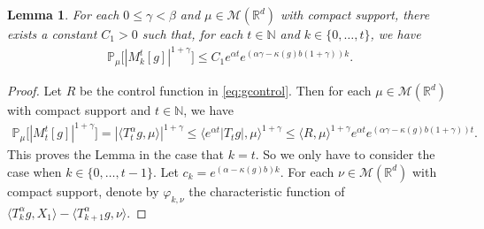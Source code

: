 \documentclass[12pt, a4paper]{amsart}
\newtheorem{lem}[thm]{Lemma}
\theoremstyle{definition}
\numberwithin{equation}{section}
\begin{document}
\begin{lem}\label{lem: lemma23}
For each $0\leq \gamma < \beta$ and $\mu \in \mathcal M(\mathbb R^d)$ with compact support, there exists a constant $C_1>0$ such that, for each $t\in \mathbb N$ and $k \in \{0,\dots,t\}$, we have
\begin{align}
\label{eq: upper bound of 1+gamma moment of Mktg}
    \mathbb P_\mu\big[|M_k^t[g]|^{1+\gamma}\big]
    \leq C_1 e^{\alpha t}e^{(\alpha \gamma - \kappa(g)b(1+\gamma))k}.
\end{align}
\end{lem}
\begin{proof}
    Let $R$ be the control function in \eqref{eq:gcontrol}.
    Then for each $\mu\in \mathcal M(\mathbb R^d)$ with compact support and $t\in \mathbb N$, we have
\begin{align}
    \mathbb P_\mu\big[|M_t^t[g]|^{1+\gamma}\big]
    = |\langle T_t^\alpha g, \mu\rangle|^{1+\gamma}
    \leq \langle e^{\alpha t} |T_tg|, \mu\rangle^{1+\gamma}
    \leq  \langle R,\mu\rangle^{1+\gamma} e^{\alpha t} e^{(\alpha\gamma- \kappa(g)b(1+\gamma))t}.
\end{align}
    This proves the Lemma in the case that $k = t$.
    So we only have to consider the case when $k \in \{0,\dots,t-1\}$.
    Let $c_k=e^{(\alpha-\kappa(g)b)k}$.
    For each $\nu \in \mathcal M(\mathbb R^d)$ with compact support, denote by $\varphi_{k,\nu}$ the characteristic function of $\langle T_k^{\alpha}g, X_1\rangle-\langle T_{k+1}^{\alpha}g,\nu\rangle$.


\end{proof}
\end{document}
